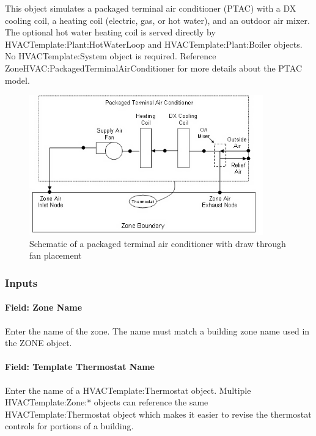 This object simulates a packaged terminal air conditioner (PTAC) with a DX cooling coil, a heating coil (electric, gas, or hot water), and an outdoor air mixer. The optional hot water heating coil is served directly by HVACTemplate:Plant:HotWaterLoop and HVACTemplate:Plant:Boiler objects. No HVACTemplate:System object is required. Reference ZoneHVAC:PackagedTerminalAirConditioner for more details about the PTAC model.

\begin{figure}[hbtp] %
\centering
\includegraphics[width=0.9\textwidth, height=0.9\textheight, keepaspectratio=true]{media/image603.png}
\caption{Schematic of a packaged terminal air conditioner with draw through fan placement \protect \label{fig:schematic-of-a-packaged-terminal-air}}
\end{figure}

\subsubsection{Inputs}\label{inputs-4-016}

\paragraph{Field: Zone Name}\label{field-zone-name-3-001}

Enter the name of the zone. The name must match a building zone name used in the ZONE object.

\paragraph{Field: Template Thermostat Name}\label{field-template-thermostat-name-3}

Enter the name of a HVACTemplate:Thermostat object. Multiple HVACTemplate:Zone:* objects can reference the same HVACTemplate:Thermostat object which makes it easier to revise the thermostat controls for portions of a building.

